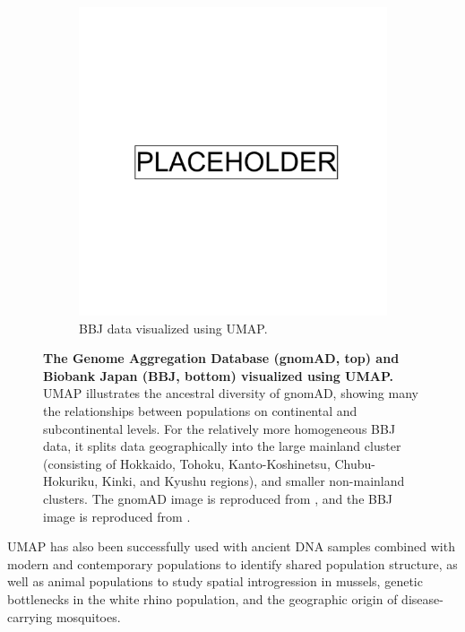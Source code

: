 \begin{figure}[h!]
  \begin{subfigure}[b]{0.4\linewidth}
    \includegraphics[width=\linewidth]{placeholder.png}
    \caption{BBJ data visualized using UMAP.}
    \label{fig:BBJ_UMAP}
  \end{subfigure}
  \caption[UMAP of gnomAD and Biobank Japan]{\textbf{The Genome Aggregation Database (gnomAD, top) and Biobank Japan (BBJ, bottom) visualized using UMAP.} UMAP illustrates the ancestral diversity of gnomAD, showing many the relationships between populations on continental and subcontinental levels. For the relatively more homogeneous BBJ data, it splits data geographically into the large mainland cluster (consisting of Hokkaido, Tohoku, Kanto-Koshinetsu, Chubu-Hokuriku, Kinki, and Kyushu regions), and smaller non-mainland clusters. The gnomAD image is reproduced from \citep{karczewski_mutational_2020}, and the BBJ image is reproduced from \citep{sakaue_dimensionality_2020}.
  }
  \label{fig:external_UMAP}
\end{figure}

\clearpage

UMAP has also been successfully used with ancient DNA samples combined with modern and contemporary populations to identify shared population structure\citep{margaryan_population_2019}, as well as animal populations to study spatial introgression in mussels\citep{simon_local_2019}, genetic bottlenecks in the white rhino population\citep{sanchez-barreiro_historical_2020}, and the geographic origin of disease-carrying mosquitoes\citep{consortium_genome_2020}\citep{schmidt2020population}. 


